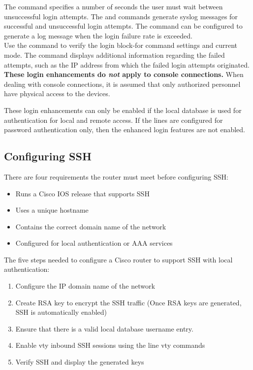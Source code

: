 The  command specifies a number of seconds the user must wait between unsuccessful login attempts. The  and  commands generate syslog messages for successful and unsuccessful login attempts. The  command can be configured to generate a log message when the login failure rate is exceeded.\\

Use the  command to verify the login block-for command settings and current mode. The  command displays additional information regarding the failed attempts, such as the IP address from which the failed login attempts originated.\\

\textbf{These login enhancements do \emph{not} apply to console connections.} When dealing with console connections, it is assumed that only authorized personnel have physical access to the devices.

\note These login enhancements can only be enabled if the local database is used for authentication for local and remote access. If the lines are configured for password authentication only, then the enhanced login features are not enabled.

\subsection{Configuring SSH}

There are four requirements the router must meet before configuring SSH:

\begin{itemize}
\item Runs a Cisco IOS release that supports SSH
\item Uses a unique hostname
\item Contains the correct domain name of the network
\item Configured for local authentication or AAA services
\end{itemize}

The five steps needed to configure a Cisco router to support SSH with local authentication:

\begin{enumerate}
\item Configure the IP domain name of the network
\item Create RSA key to encrypt the SSH traffic (Once RSA keys are generated, SSH is automatically enabled)
\item Ensure that there is a valid local database username entry.
\item Enable vty inbound SSH sessions using the line vty commands
\item Verify SSH and display the generated keys
\end{enumerate}

